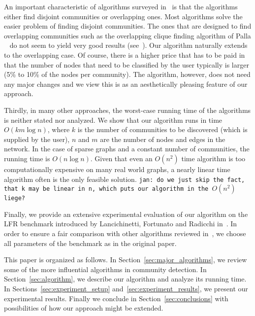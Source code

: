 An important characteristic of algorithms surveyed in~\cite{LF09} 
is that the algorithms either find disjoint communities or overlapping 
ones. Most algorithms solve the easier problem of finding disjoint communities. 
The ones that are designed to find overlapping communities such as the overlapping clique finding 
algorithm of Palla \etal~\cite{PDFV05} do not seem to yield very good results (see~\cite{LF09}).
Our algorithm naturally extends to the overlapping case. Of course, there is a higher 
price that has to be paid in that the number of nodes that need to be classified by the user 
typically is larger (5\% to 10\% of the nodes per community). The algorithm, however,
does not need any major changes and we view this is as an aesthetically pleasing 
feature of our approach. 

Thirdly, in many other approaches, the worst-case running time of the algorithms 
is neither stated nor analyzed. We show that our algorithm runs in time $O(k m \log n)$, 
where $k$ is the number of communities to be discovered (which is supplied by the user), 
$n$ and $m$ are the number of nodes and edges in the network. In the case of sparse graphs 
and a constant number of communities, the running time is $O(n \log n)$. Given that even 
an $O(n^2)$ time algorithm is too computationally expensive on many real world graphs, 
a nearly linear time algorithm often is the only feasible solution.
\texttt{jan: do we just skip the fact, that k may be linear in n, which puts our algorithm in the $O(n^2)$ liege?}

Finally, we provide an extensive experimental evaluation of our algorithm on the LFR benchmark
introduced by Lancichinetti, Fortunato and Radicchi in~\cite{LFR08, LF09}. In order to ensure 
a fair comparison with other algorithms reviewed in~\cite{LF09}, 
we choose all parameters of the benchmark as in the original paper.


This paper is organized as follows. In Section~\ref{sec:major_algorithms}, we review some 
of the more influential algorithms in community detection. In Section~\ref{sec:algorithm}, we 
describe our algorithm and analyze its running time. In Sections~\ref{sec:experiment_setup} 
and~\ref{sec:experiment_results}, we present our experimental results. Finally we conclude 
in Section~\ref{sec:conclusions} with possibilities of how our approach might be extended. 



